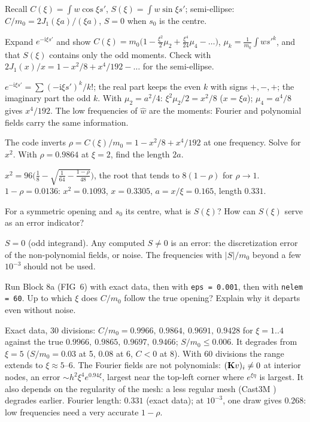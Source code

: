 \begin{gbox}{Recall}
$\displaystyle C(\xi)=\int w\cos\xi s'$, $\displaystyle S(\xi)=\int w\sin\xi s'$;
semi-ellipse: $C/m_0=2J_1(\xi a)/(\xi a)$, $S=0$ when $s_0$ is the centre.
\end{gbox}

\q Expand $e^{-\mathrm i\xi s'}$ and show
$C(\xi)=m_0\bigl(1-\tfrac{\xi^2}{2}\mu_2+\tfrac{\xi^4}{24}\mu_4-\dots\bigr)$,
$\mu_k=\frac1{m_0}\int ws'^k$, and that $S(\xi)$ contains only the odd
moments. Check with $2J_1(x)/x=1-x^2/8+x^4/192-\dots$ for the semi-ellipse.
\begin{answer}
$e^{-\mathrm i\xi s'}=\sum(-\mathrm i\xi s')^k/k!$; the real part keeps the even
$k$ with signs $+,-,+$; the imaginary part the odd $k$. With $\mu_2=a^2/4$:
$\xi^2\mu_2/2=x^2/8$ ($x=\xi a$); $\mu_4=a^4/8$ gives $x^4/192$. The low
frequencies of $\hat w$ are the moments: Fourier and polynomial fields carry
the same information.
\end{answer}

\q The code inverts $\rho=C(\xi)/m_0=1-x^2/8+x^4/192$ at one frequency.
Solve for $x^2$. With $\rho=0.9864$ at $\xi=2$, find the length $2a$.
\begin{answer}
$x^2=96\bigl(\tfrac18-\sqrt{\tfrac1{64}-\tfrac{1-\rho}{48}}\bigr)$, the
root that tends to $8(1-\rho)$ for $\rho\to1$. $1-\rho=0.0136$:
$x^2=0.1093$, $x=0.3305$, $a=x/\xi=0.165$, length $0.331$.
\end{answer}

\q For a symmetric opening and $s_0$ its centre, what is $S(\xi)$? How can
$S(\xi)$ serve as an error indicator?
\begin{answer}
$S=0$ (odd integrand). Any computed $S\ne0$ is an error: the discretization
error of the non-polynomial fields, or noise. The frequencies with
$|S|/m_0$ beyond a few $10^{-3}$ should not be used.
\end{answer}

\qc Run Block 8a (FIG~6) with exact data, then with \texttt{eps = 0.001},
then with \texttt{nelem = 60}. Up to which $\xi$ does $C/m_0$ follow the true
opening? Explain why it departs even without noise.
\begin{answer}
Exact data, 30 divisions: $C/m_0=0.9966,\ 0.9864,\ 0.9691,\ 0.9428$ for
$\xi=1..4$ against the true $0.9966,\ 0.9865,\ 0.9697,\ 0.9466$;
$S/m_0\le0.006$. It degrades from $\xi=5$ ($S/m_0=0.03$ at 5, $0.08$
at 6, $C<0$ at 8). With $60$ divisions the range extends to
$\xi\approx5$--$6$. The
Fourier fields are not polynomials: $(\mathbf{K}v)_i\ne0$ at interior nodes, an
error $\sim h^2\xi^4e^{0.94\xi}$, largest near the top-left corner where
$e^{\xi\eta}$ is largest. It also depends on the regularity of the mesh: a
less regular mesh (Cast3M ) degrades earlier. Fourier length:
$0.331$ (exact data); at $10^{-3}$, one draw gives $0.268$: low frequencies
need a very accurate $1-\rho$.
\end{answer}

